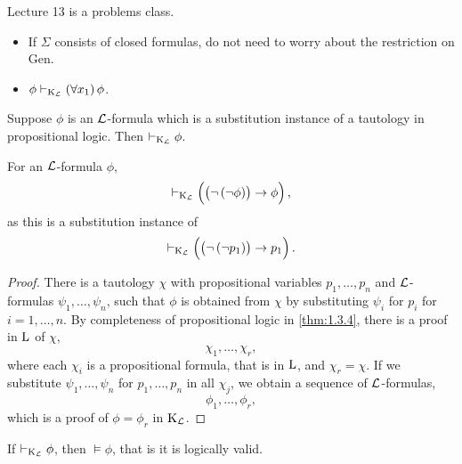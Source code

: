 
Lecture 13 is a problems class.


\begin{remark}
\hfill
\begin{itemize}
\item If $ \Sigma $ consists of closed formulas, do not need to worry about the restriction on Gen.
\item $ \phi \vdash_{\K_\LLL} \fab{x_1}\phi $.
\end{itemize}
\end{remark}

\begin{theorem}
\label{thm:2.4.4}
Suppose $ \phi $ is an $ \mathcal{L} $-formula which is a substitution instance of a tautology in propositional logic. Then $ \vdash_{\mathrm{K}_{\mathcal{L}}} \phi $.
\end{theorem}

\begin{example*}
For an $ \mathcal{L} $-formula $ \phi $,
$$ \vdash_{\K_\LLL} \impb{\notb{\notb{\phi}}}{\phi}, $$
as this is a substitution instance of
$$ \vdash_{\K_\LLL} \impb{\notb{\notb{p_1}}}{p_1}. $$
\end{example*}

\begin{proof}
There is a tautology $ \chi $ with propositional variables $ p_1, \dots, p_n $ and $ \mathcal{L} $-formulas $ \psi_1, \dots, \psi_n $, such that $ \phi $ is obtained from $ \chi $ by substituting $ \psi_i $ for $ p_i $ for $ i = 1, \dots, n $. By completeness of propositional logic in \ref{thm:1.3.4}, there is a proof in $ \mathrm{L} $ of $ \chi $,
$$ \chi_1, \dots, \chi_r, $$
where each $ \chi_i $ is a propositional formula, that is in $ \mathrm{L} $, and $ \chi_r = \chi $. If we substitute $ \psi_1, \dots, \psi_n $ for $ p_1, \dots, p_n $ in all $ \chi_j $, we obtain a sequence of $ \mathcal{L} $-formulas,
$$ \phi_1, \dots, \phi_r, $$
which is a proof of $ \phi = \phi_r $ in $ \mathrm{K}_{\mathcal{L}} $.
\end{proof}

\pagebreak

\begin{theorem}
If $ \vdash_{\mathrm{K}_{\mathcal{L}}} \phi $, then $ \vDash \phi $, that is it is logically valid.
\end{theorem}

